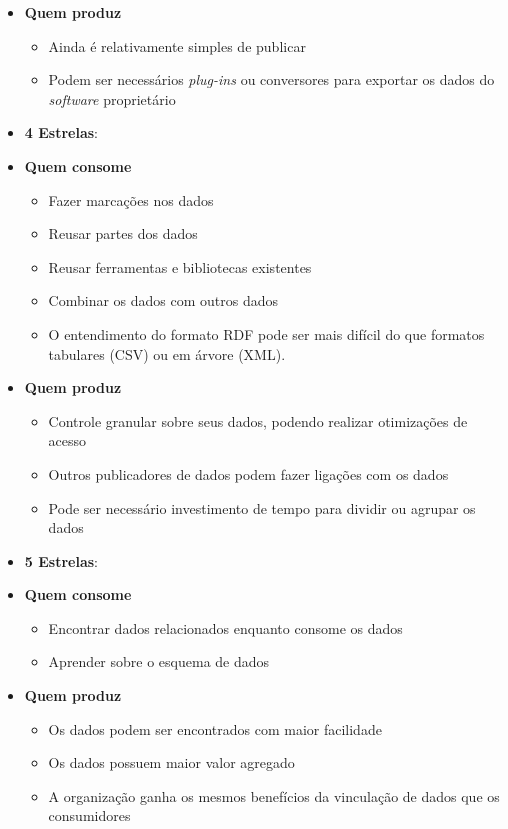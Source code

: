 \begin{itemize}
	\item[] \textbf{Quem produz}
		\begin{itemize}
			\itemsep0em
			\item Ainda é relativamente simples de publicar
			\item Podem ser necessários \emph{plug-ins} ou conversores para exportar os dados do \emph{software} proprietário
		\end{itemize}
\item \textbf{4 Estrelas}:
	\item[] \textbf{Quem consome}
		\begin{itemize}
			\itemsep0em
			\item Fazer marcações nos dados
			\item Reusar partes dos dados
			\item Reusar ferramentas e bibliotecas existentes
			\item Combinar os dados com outros dados
			\item O entendimento do formato RDF pode ser mais difícil do que formatos tabulares (CSV) ou em árvore (XML).
			
		\end{itemize}
		
	\item[] \textbf{Quem produz}
		\begin{itemize}
			\itemsep0em
			\item Controle granular sobre seus dados, podendo realizar otimizações de acesso
			\item Outros publicadores de dados podem fazer ligações com os dados
			\item Pode ser necessário investimento de tempo para dividir ou agrupar os dados
			
		\end{itemize}
\item \textbf{5 Estrelas}:
	\item[] \textbf{Quem consome}
		\begin{itemize}
			\itemsep0em
			\item Encontrar dados relacionados enquanto consome os dados
			\item Aprender sobre o esquema de dados	
		\end{itemize}
		
	\item[] \textbf{Quem produz}
		\begin{itemize}
			\itemsep0em
			\item Os dados podem ser encontrados com maior facilidade
			\item Os dados possuem maior valor agregado
			\item A organização ganha os mesmos benefícios da vinculação de dados que os consumidores
		\end{itemize}
\end{itemize}

